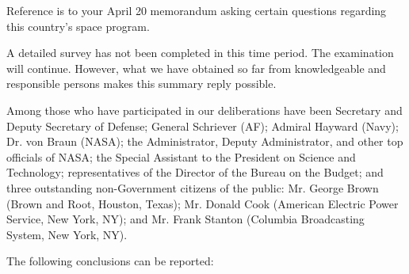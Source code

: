 \documentclass[letterpaper,11pt]{texMemo}
\begin{document}
\maketitle

Reference is to your April 20 memorandum asking certain questions regarding this country's space program.

A detailed survey has not been completed in this time period.  The examination will continue.  However, what we have obtained so far from knowledgeable and responsible persons makes this summary reply possible.

Among those who have participated in our deliberations have been Secretary and Deputy Secretary of Defense; General Schriever (AF); Admiral Hayward (Navy); Dr. von Braun (NASA); the Administrator, Deputy Administrator, and other top officials of NASA; the Special Assistant to the President on Science and Technology; representatives of the Director of the Bureau on the Budget; and three outstanding non-Government citizens of the public: Mr. George Brown (Brown and Root, Houston, Texas); Mr. Donald Cook (American Electric Power Service, New York, NY); and Mr. Frank Stanton (Columbia Broadcasting System, New York, NY).

The following conclusions can be reported:
	
\end{document}
